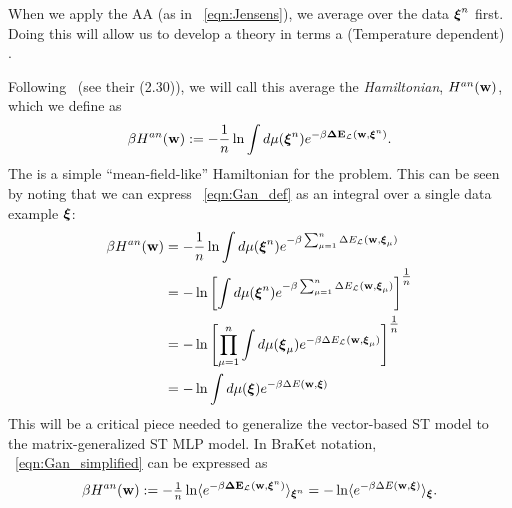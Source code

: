 When we apply the AA (as in \EQN~\ref{eqn:Jensens}), 
we average over the data $\boldsymbol{\xi}^{n}$ first. 
Doing this will allow us to develop a theory in terms a (Temperature dependent) \EffectivePotential. 

Following~\cite{SST92} (see their \EQN(2.30)), we will call this average the \emph{\Annealed Hamiltonian}, $H^{an}({\mathbf{w}})$, 
which we define as  %
  \begin{align}
   \label{eqn:Gan_def}
   \beta H^{an}({\mathbf{w}}):= - \frac{1}{n}\ln  \int d\mu(\boldsymbol{\xi}^{n})e^{-\beta\mathbf{\Delta {E}}_{\mathcal{L}}(\mathbf{w}, \boldsymbol{\xi}^{n})}.
  \end{align}
The \AnnealedHamiltonian is a simple ``mean-field-like'' Hamiltonian for the problem.
This can be seen by noting that we can express \EQN~\ref{eqn:Gan_def} as an integral over a single data example $\boldsymbol{\xi}$:
 \begin{align}
   \nonumber
   \beta H^{an}({\mathbf{w}}) &=  - \frac{1}{n}\ln  \int d\mu(\boldsymbol{\xi}^{n})e^{-\beta\sum_{\mu=1}^{n}\Delta E_{\mathcal{L}}({\mathbf{w}},\boldsymbol{\xi}_{\mu})} \\ \nonumber
   &=  - \ln \left[\int d\mu(\boldsymbol{\xi}^{n})e^{-\beta\sum_{\mu=1}^{n}\Delta E_{\mathcal{L}}({\mathbf{w}},\boldsymbol{\xi}_{\mu})}\right]^{\tfrac{1}{n}} \\ \nonumber
   &=  - \ln \left[\prod_{\mu=1}^{n}\int d\mu(\boldsymbol{\xi}_{\mu})e^{-\beta\Delta E_{\mathcal{L}}({\mathbf{w}},\boldsymbol{\xi}_{\mu})}\right]^{\tfrac{1}{n}} \\ 
   \label{eqn:Gan_simplified}
   &=  - \ln  \int d\mu(\boldsymbol{\xi})e^{-\beta\Delta E({\mathbf{w}},\boldsymbol{\xi})}
 \end{align}
This will be a critical piece needed to generalize the vector-based ST \Perceptron model to the matrix-generalized ST MLP model.
In BraKet notation, \EQN~\ref{eqn:Gan_simplified} can be expressed as
\begin{eqnarray*}
    \beta H^{an}({\mathbf{w}}):=  -\tfrac{1}{n}\ln\langle e^{-\beta\mathbf{\Delta {E}}_{\mathcal{L}}(\mathbf{w}, \boldsymbol{\xi}^{n})}\rangle_{\boldsymbol{\xi}^{n}}=  -\ln \langle e^{-\beta\Delta E({\mathbf{w}},\boldsymbol{\xi})}\rangle_{\boldsymbol{\xi}}.
\end{eqnarray*}


